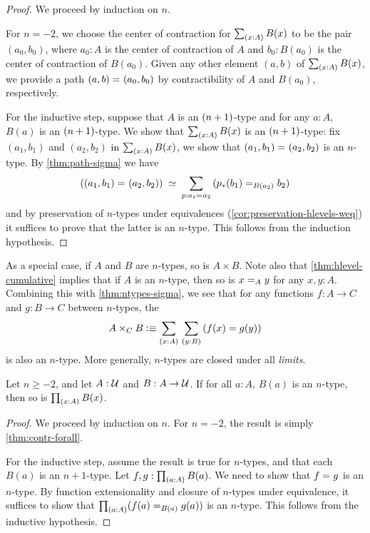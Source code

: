 \begin{proof}
 We proceed by induction on $n$.

 For $n = -2$, we choose the center of contraction for $\sm{x : A} B(x)$ to be the pair
       $(a_0, b_0)$, where $a_0 : A$ is the center of contraction of $A$ and $b_0 : B(a_0)$ is the center of contraction of $B(a_0)$.
       Given any other element $(a,b)$ of $\sm{x : A} B(x)$, we provide a path $\id{(a, b)}{(a_0,b_0)}$
       by contractibility of $A$ and $B(a_0)$, respectively.

 For the inductive step, suppose that $A$ is an $\nplusone$-type and
         for any $a : A$, $B(a)$ is an $\nplusone$-type. We show that $\sm{x : A} B(x)$ is an $\nplusone$-type:
      fix $(a_1, b_1)$ and $(a_2,b_2)$ in $\sm{x : A} B(x)$,
     we show that $\id{(a_1, b_1)}{(a_2,b_2)}$ is an $n$-type.
      By \autoref{thm:path-sigma} we have
      \[ \eqvspaced{(\id{(a_1, b_1)}{(a_2,b_2)})}{\sm{p : \id{a_1}{a_2}} (\id[B(a_2)]{\trans{p}{b_1}}{b_2})} \]
   and by preservation of $n$-types under equivalences (\autoref{cor:preservation-hlevels-weq})
   it suffices to prove that the latter is an $n$-type. This follows from the
   induction hypothesis.
\end{proof}

As a special case, if $A$ and $B$ are $n$-types, so is $A\times B$.
Note also that \autoref{thm:hlevel-cumulative} implies that if $A$ is an $n$-type, then so is $\id[A]xy$ for any $x,y:A$.
Combining this with \autoref{thm:ntypes-sigma}, we see that for any functions $f:A\to C$ and $g:B\to C$ between $n$-types, the 
\[ A\times_C B \defeq \sm{x:A}{y:B} (f(x)=g(y)) \]
is also an $n$-type.
More generally, $n$-types are closed under all \emph{limits}.

\begin{thm}\label{thm:hlevel-prod}
 Let $n\geq -2$, and let $A : \type$ and $B : A \to \type$.
 If for all $a : A$, $B(a)$ is an $n$-type, then so is $\prd{x : A} B(x)$.
\end{thm}

\begin{proof}
  We proceed by induction on $n$.
  For $n = -2$, the result is simply \autoref{thm:contr-forall}.

  For the inductive step, assume the result is true for $n$-types, and that each $B(a)$ is an $n+1$-type.
  Let $f, g : \prd{a:A}B(a)$.
  We need to show that $\id{f}{g}$ is an $n$-type.
  By function extensionality and closure of $n$-types under equivalence, it suffices to show that $\prd{a : A} (\id[B(a)]{f(a)}{g(a)})$ is an $n$-type.
  This follows from the inductive hypothesis.
\end{proof}

